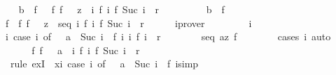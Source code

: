 \begin{isabellebody}
\ \ \isamarkupfalse%
\ {\isachardoublequoteopen}b\ {\isacharequal}\ f\ {}\ {\isasymLongrightarrow}\ {\isasymexists}f{\isachardot}\ f\ {}\ {\isacharequal}\ z\ {\isasymand}\ {\isacharparenleft}{\isasymforall}i{\isachardot}\ {\isacharparenleft}f\ i{\isacharcomma}\ f\ {\isacharparenleft}Suc\ i{\isacharparenright}{\isacharparenright}\ {\isasymin}\ r{\isacharparenright}{\isachardoublequoteclose}\isanewline
\ \ \ \ \ \ \ \ \ {\isachardoublequoteopen}b\ {\isacharequal}\ f\ {}{\isachardoublequoteclose}\isanewline
\ \ \isamarkupfalse%
\ \isamarkupfalse%
\ f\ \ f{}{\isacharcolon}\ {\isachardoublequoteopen}f\ {}\ {\isacharequal}\ z{\isachardoublequoteclose}\ \ seq{\isacharcolon}\ {\isachardoublequoteopen}{\isasymforall}i{\isachardot}\ {\isacharparenleft}f\ i{\isacharcomma}\ f\ {\isacharparenleft}Suc\ i{\isacharparenright}{\isacharparenright}\ {\isasymin}\ r{\isachardoublequoteclose}\isanewline
\ \ \ \ \isamarkupfalse%
\ iprover\isanewline
\ \ \isacommand{{\isacharbraceleft}}\isamarkupfalse%
\isanewline
\ \ \ \ \isamarkupfalse%
\ i\ \isamarkupfalse%
\ {\isachardoublequoteopen}{\isacharparenleft}{\isacharparenleft}{\isasymlambda}i{\isachardot}\ case\ i\ of\ {}\ {\isasymRightarrow}\ a\ {\isacharbar}\ Suc\ i\ {\isasymRightarrow}\ f\ i{\isacharparenright}\ i{\isacharcomma}\ f\ i{\isacharparenright}\ {\isasymin}\ r{\isachardoublequoteclose}\isanewline
\ \ \ \ \ \ \isamarkupfalse%
\ seq\ a{\isacharunderscore}z\ f{}\isanewline
\ \ \ \ \ \ \isamarkupfalse%
\ {\isacharparenleft}cases\ i{\isacharparenright}\ auto\isanewline
\ \ \isacommand{{\isacharbraceright}}\isamarkupfalse%
\isanewline
\ \ \isamarkupfalse%
\isanewline
\ \ \isamarkupfalse%
\ {\isachardoublequoteopen}{\isasymexists}f{\isachardot}\ f\ {}\ {\isacharequal}\ a\ {\isasymand}\ {\isacharparenleft}{\isasymforall}i{\isachardot}\ {\isacharparenleft}f\ i{\isacharcomma}\ f\ {\isacharparenleft}Suc\ i{\isacharparenright}{\isacharparenright}\ {\isasymin}\ r{\isacharparenright}{\isachardoublequoteclose}\isanewline
\ \ \ \ \isamarkupfalse%
\ {\isacharminus}\ {\isacharparenleft}rule\ exI\ {\isacharbrackleft}\ x{\isacharequal}{\isachardoublequoteopen}{\isasymlambda}i{\isachardot}\ case\ i\ of\ {}\ {\isasymRightarrow}\ a\ {\isacharbar}\ Suc\ i\ {\isasymRightarrow}\ f\ i{\isachardoublequoteclose}{\isacharbrackright}{\isacharcomma}simp{\isacharparenright}\isanewline

\end{isabellebody}
